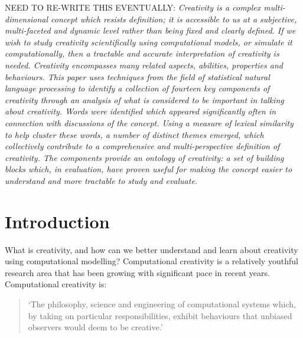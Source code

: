 \documentclass[10pt,letterpaper]{article}
\begin{document}
NEED TO RE-WRITE THIS EVENTUALLY:
{\em
Creativity is a complex multi-dimensional concept which resists definition; it is accessible to us at a subjective, multi-faceted and dynamic level rather than being fixed and clearly defined. If we wish to study creativity scientifically using computational models, or simulate it computationally, then a tractable and accurate interpretation of creativity is needed. Creativity encompasses many related aspects, abilities, properties and behaviours. This paper uses techniques from the field of statistical natural language processing to identify a collection of fourteen key components of creativity through an analysis of what is considered to be important in talking about creativity. Words were identified which appeared significantly often in connection with discussions of the concept. Using a measure of lexical similarity to help cluster these words, a number of distinct themes emerged, which collectively contribute to a comprehensive and multi-perspective definition of creativity. The components provide an ontology of creativity: a set of building blocks which, in evaluation, have proven useful for making the concept easier to understand and more tractable to study and evaluate.}



\linenumbers

\section*{Introduction}\label{intro}


What is creativity, and how can we better understand and learn about creativity using computational modelling? Computational creativity is a relatively youthful research area that has been growing with significant pace in recent years. Computational creativity is: 
\begin{quote}`The philosophy, science and engineering of computational systems which, by taking on particular responsibilities, exhibit behaviours that unbiased observers would deem to be creative.' 
\cite[p. 21]{coltonwiggins12}
\end{quote}
\end{document}
